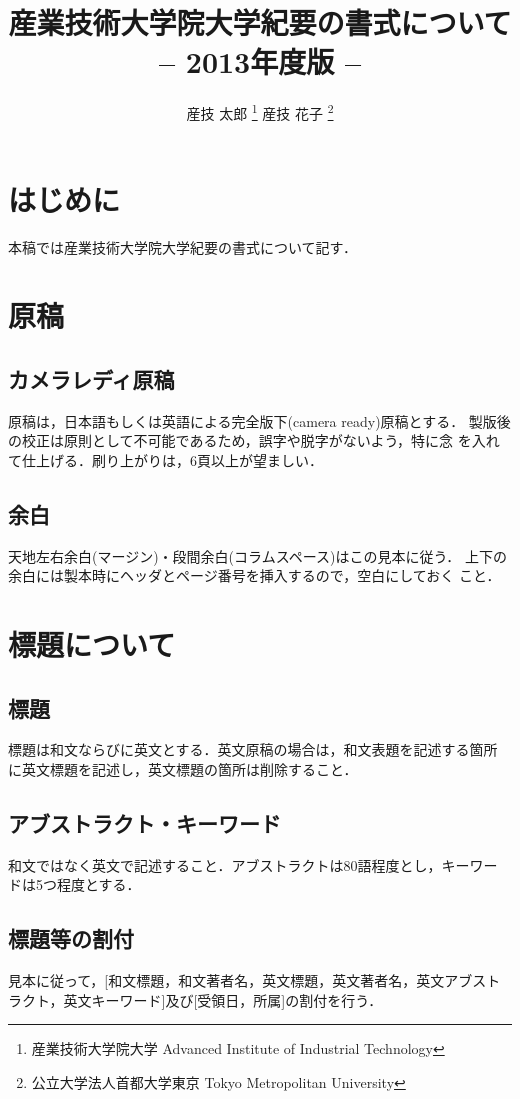 \documentclass[a4j, 12Q, twocolumn, twoside]{jsarticle}
\title{産業技術大学院大学紀要の書式について\\-- 2013年度版 --}
\author{
  産技 太郎
  \thanks{産業技術大学院大学 \newline
  Advanced Institute of Industrial Technology}
  産技 花子
  \thanks{公立大学法人首都大学東京 \newline
  Tokyo Metropolitan University}
}
\begin{document}
\amaketitle[8pt]

\section{はじめに}
本稿では産業技術大学院大学紀要の書式について記す．

\section{原稿}
\subsection{カメラレディ原稿}
原稿は，日本語もしくは英語による完全版下(camera ready)原稿とする．
製版後の校正は原則として不可能であるため，誤字や脱字がないよう，特に念
を入れて仕上げる．刷り上がりは，6頁以上が望ましい．

\subsection{余白}
天地左右余白(マージン)・段間余白(コラムスペース)はこの見本に従う．
上下の余白には製本時にヘッダとページ番号を挿入するので，空白にしておく
こと．

\section{標題について}
\subsection{標題}
標題は和文ならびに英文とする．英文原稿の場合は，和文表題を記述する箇所
に英文標題を記述し，英文標題の箇所は削除すること．

\subsection{アブストラクト・キーワード}
和文ではなく英文で記述すること．アブストラクトは80語程度とし，キーワー
ドは5つ程度とする．

\subsection{標題等の割付}
見本に従って，[和文標題，和文著者名，英文標題，英文著者名，英文アブスト
ラクト，英文キーワード]及び[受領日，所属]の割付を行う．
\end{document}
